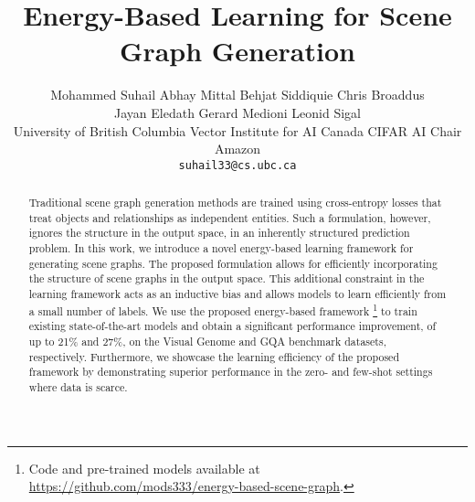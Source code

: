 \documentclass[final]{cvpr}
\begin{document}
\title{Energy-Based Learning for Scene Graph Generation}

\author{
Mohammed Suhail \qquad Abhay Mittal \qquad Behjat Siddiquie  \qquad Chris Broaddus \\ Jayan Eledath  \qquad Gerard Medioni \qquad Leonid Sigal\\
University of British Columbia \qquad
Vector Institute for AI \qquad
Canada CIFAR AI Chair \qquad
 Amazon \\
{\tt\small suhail33@cs.ubc.ca}    \\   
}

\maketitle
\begin{abstract}
Traditional scene graph generation methods are trained using cross-entropy losses that treat objects and relationships as independent entities. Such a formulation, however, ignores the structure in the output space, in an inherently structured prediction problem.
In this work, we introduce a novel energy-based learning framework for generating scene graphs. The proposed formulation allows for efficiently incorporating the structure of scene graphs in the output space. This additional constraint in the learning framework acts as an inductive bias and allows models to learn efficiently from a small number of labels. 
We use the proposed energy-based framework \footnote{Code and pre-trained models available at \url{https://github.com/mods333/energy-based-scene-graph}.} to train existing state-of-the-art models and obtain a significant performance improvement, of up to 21\% and 27\%, on the Visual Genome \cite{krishna2017visual} and GQA \cite{hudson2018gqa} benchmark datasets, respectively. Furthermore, we showcase the learning efficiency of the proposed framework by demonstrating superior performance in the zero- and few-shot settings where data is scarce.
\end{abstract}
\end{document}
